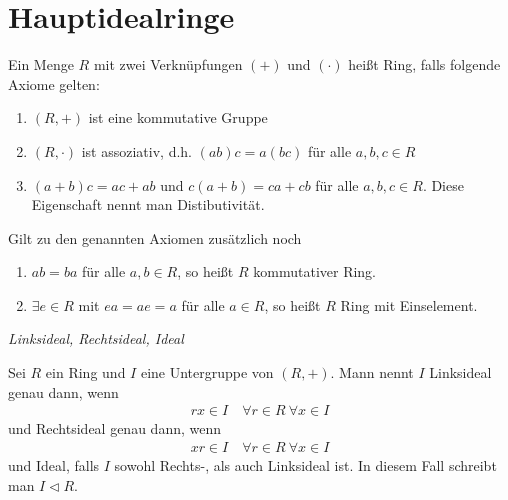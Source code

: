 \section{Hauptidealringe}

Ein Menge $R$ mit zwei Verknüpfungen $(+)$ und $(\cdot)$ heißt Ring, falls folgende Axiome gelten:
\begin{enumerate}
    \item $(R,+)$ ist eine kommutative Gruppe
    \item $(R,\cdot)$ ist assoziativ, d.h. $(ab)c=a(bc)$ für alle $a,b,c\in R$
    \item $(a+b)c=ac+ab$ und $c(a+b)=ca+cb$ für alle $a,b,c\in R$. Diese Eigenschaft nennt man Distibutivität.
\end{enumerate}
Gilt zu den genannten Axiomen zusätzlich noch
\begin{enumerate}
    \item $ab=ba$ für alle $a,b \in R$, so heißt $R$ kommutativer Ring.
    \item $\exists e\in R$ mit $ea=ae=a$ für alle $a\in R$, so heißt $R$ Ring mit Einselement.
\end{enumerate}

\begin{mydef} \textit{Linksideal, Rechtsideal, Ideal}

    Sei $R$ ein Ring und $I$ eine Untergruppe von $(R,+)$. Mann nennt $I$ Linksideal genau dann, wenn
    \begin{align*}
        rx \in I \quad \forall r \in R \ \forall x \in I
    \end{align*}
    und Rechtsideal genau dann, wenn
    \begin{align*}
        xr \in I \quad \forall r \in R \ \forall x \in I
    \end{align*}
    und Ideal, falls $I$ sowohl Rechts-, als auch Linksideal ist. In diesem Fall schreibt man $I\lhd R$.
\end{mydef}

